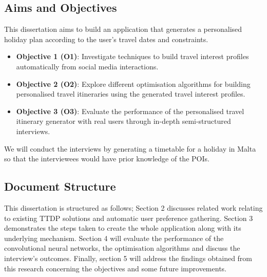 \subsection{Aims and Objectives}

This dissertation aims to build an application that
generates a personalised holiday plan according to the
user's travel dates and constraints.


\begin{itemize}
    \item \textbf{Objective 1 (O1)}: Investigate techniques to build travel interest
    profiles automatically from social media interactions.  
    \item \textbf{Objective 2 (O2)}: Explore different optimisation algorithms for
    building personalised travel itineraries using the
    generated travel interest profiles. 
    \item \textbf{Objective 3 (O3)}: Evaluate the
    performance of the personalised travel itinerary
    generator with real users through in-depth
    semi-structured interviews. 

\end{itemize}

We will conduct the interviews by generating a
timetable for a holiday in Malta so that the
interviewees would have prior knowledge of the POIs.

\subsection{Document Structure}

This dissertation is structured as follows; Section 2
discusses related work relating to existing TTDP
solutions and automatic user preference gathering.
Section 3 demonstrates the steps taken to create the
whole application along with its underlying mechanism.
Section 4 will evaluate the performance of the
convolutional neural networks, the optimisation
algorithms and discuss the interview's outcomes.
Finally, section 5 will address the findings obtained
from this research concerning the objectives and some
future improvements.

